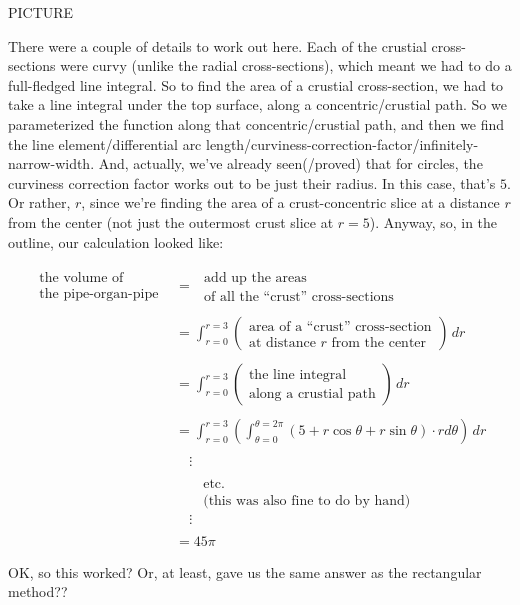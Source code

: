 \documentclass[
]{article}
\begin{document}
PICTURE

There were a couple of details to work out here. Each of the crustial cross-sections were curvy (unlike the radial cross-sections), which meant we had to do a full-fledged line integral. So to find the area of a crustial cross-section, we had to take a line integral under the top surface, along a concentric/crustial path. So we parameterized the function along that concentric/crustial path, and then we find the line element/differential arc length/curviness-correction-factor/infinitely-narrow-width. And, actually, we've already seen(/proved) that for circles, the curviness correction factor works out to be just their radius. In this case, that's \(5\). Or rather, \(r\), since we're finding the area of a crust-concentric slice at a distance \(r\) from the center (not just the outermost crust slice at \(r=5\)). Anyway, so, in the outline, our calculation looked like:

\begin{align*}
\substack{\text{the volume of}\\\text{the pipe-organ-pipe}} &= \,\,\substack{\text{add up the areas}\\\text{of all the ``crust'' cross-sections}} \\ \\
&= \int_{r=0}^{r=3} \left( \substack{\text{area of a ``crust'' cross-section}\\\text{at distance $r$ from the center}} \right)\, dr \\ \\
&= \int_{r=0}^{r=3} \left( \substack{\text{the line integral}\\\text{along a crustial path}} \right)\, dr \\ \\
&= \int_{r=0}^{r=3} \left( \int_{\theta=0}^{\theta=2\pi} (5 + r\cos\theta + r\sin\theta)\cdot r  d\theta \right) \, dr \\ \\
&\quad \vdots \\ \\
&\quad\quad \text{etc.} \\
&\quad\quad \text{(this was also fine to do by hand)} \\
&\quad \vdots \\ \\
&= 45\pi
\end{align*}

OK, so this worked? Or, at least, gave us the same answer as the rectangular method??
\end{document}
